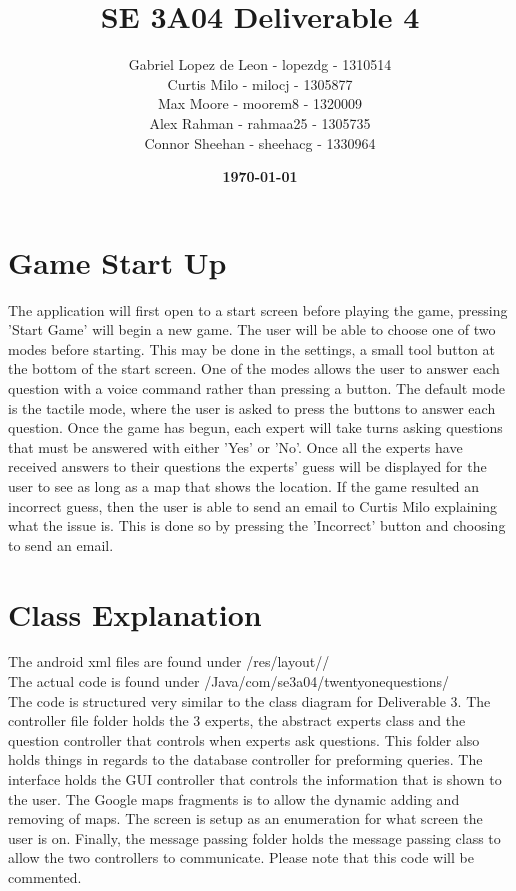 \documentclass[titlepage]{article}
\title{\textbf{SE 3A04 Deliverable 4}}
\author
{
	Gabriel Lopez de Leon - lopezdg - 1310514\\Curtis Milo - milocj - 1305877\\Max Moore - moorem8 - 1320009\\Alex Rahman - rahmaa25 - 1305735\\Connor Sheehan - sheehacg - 1330964}
\date{\textbf{\today}}
\begin{document}
\maketitle
\section{Game Start Up}
\large

The application will first open to a start screen before playing the game, pressing 'Start Game' will begin a new game. The user will be able to choose one of two modes before starting. This may be done in the settings, a small tool button at the bottom of the start screen. One of the modes allows the user to answer each question with a voice command rather than pressing a button. The default mode is the tactile mode, where the user is asked to press the buttons to answer each question. Once the game has begun, each expert will take turns asking questions that must be answered with either 'Yes' or 'No'. Once all the experts have received answers to their questions the experts' guess will be displayed for the user to see as long as a map that shows the location. If the game resulted an incorrect guess, then the user is able to send an email to Curtis Milo explaining what the issue is. This is done so by pressing the 'Incorrect' button and choosing to send an email.

\section{Class Explanation}
The android xml files are found under /res/layout// \\
The actual code is found under /Java/com/se3a04/twentyonequestions/ \\

The code is structured very similar to the class diagram for Deliverable 3. The controller file folder holds the 3 experts, the abstract experts class and the question controller that controls when experts ask questions. This folder also holds things in regards to the database controller for preforming queries. The interface holds the GUI controller that controls the information that is shown to the user. The Google maps fragments is to allow the dynamic adding and removing of maps. The screen is setup as an enumeration for what screen the user is on. Finally, the message passing folder holds the message passing class to allow the two controllers to communicate. Please note that this code will be commented.
\end{document}
